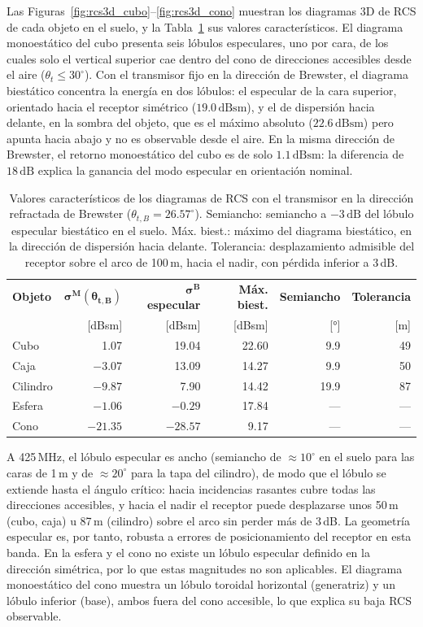 \documentclass[11pt,a4paper]{report}
\newcommand{\dB}{\,\mathrm{dB}}
\newcommand{\dBsm}{\,\mathrm{dBsm}}
\begin{document}
Las Figuras~\ref{fig:rcs3d_cubo}--\ref{fig:rcs3d_cono} muestran los
diagramas 3D de RCS de cada objeto en el suelo, y la
Tabla~\ref{tab:rcs3d} sus valores característicos. El diagrama
monoestático del cubo presenta seis lóbulos especulares, uno por cara, de
los cuales solo el vertical superior cae dentro del cono de direcciones
accesibles desde el aire ($\theta_t\le30^\circ$). Con el transmisor fijo en
la dirección de Brewster, el diagrama biestático concentra la energía en
dos lóbulos: el especular de la cara superior, orientado hacia el receptor
simétrico ($19.0\dBsm$), y el de dispersión hacia delante, en la sombra del
objeto, que es el máximo absoluto ($22.6\dBsm$) pero apunta hacia abajo y
no es observable desde el aire. En la misma dirección de Brewster, el
retorno monoestático del cubo es de solo $1.1\dBsm$: la diferencia de
$18\dB$ explica la ganancia del modo especular en orientación nominal.

\begin{table}[H]
\centering
\caption{Valores característicos de los diagramas de RCS con el transmisor
en la dirección refractada de Brewster ($\theta_{t,B}=26.57^\circ$).
Semiancho: semiancho a $-3\dB$ del lóbulo especular biestático en el suelo.
Máx. biest.: máximo del diagrama biestático, en la dirección de
dispersión hacia delante. Tolerancia: desplazamiento admisible del receptor
sobre el arco de 100\,m, hacia el nadir, con pérdida inferior a 3\,dB.}
\label{tab:rcs3d}
\small
\begin{tabular}{@{}lrrrrr@{}}
\toprule
\textbf{Objeto} & $\bm{\sigma^M(\theta_{t,B})}$ & $\bm{\sigma^B}$ \textbf{especular} & \textbf{Máx. biest.} & \textbf{Semiancho} & \textbf{Tolerancia} \\
& [dBsm] & [dBsm] & [dBsm] & [°] & [m] \\
\midrule
Cubo     & 1.07   & 19.04  & 22.60 & 9.9  & 49 \\
Caja     & $-3.07$ & 13.09 & 14.27 & 9.9  & 50 \\
Cilindro & $-9.87$ & 7.90  & 14.42 & 19.9 & 87 \\
Esfera   & $-1.06$ & $-0.29$ & 17.84 & --- & --- \\
Cono     & $-21.35$ & $-28.57$ & 9.17 & --- & --- \\
\bottomrule
\end{tabular}
\end{table}

A 425\,MHz, el lóbulo especular es ancho (semiancho de $\approx10^\circ$ en
el suelo para las caras de 1\,m y de $\approx20^\circ$ para la tapa del
cilindro), de modo que el lóbulo se extiende hasta el ángulo crítico: hacia
incidencias rasantes cubre todas las direcciones accesibles, y hacia el
nadir el receptor puede desplazarse unos 50\,m (cubo, caja) u 87\,m
(cilindro) sobre el arco sin perder más de 3\,dB. La geometría especular es,
por tanto, robusta a errores de posicionamiento del receptor en esta banda.
En la esfera y el cono no existe un lóbulo especular definido en la
dirección simétrica, por lo que estas magnitudes no son aplicables. El
diagrama monoestático del cono muestra un lóbulo toroidal horizontal
(generatriz) y un lóbulo inferior (base), ambos fuera del cono accesible,
lo que explica su baja RCS observable.
\end{document}
